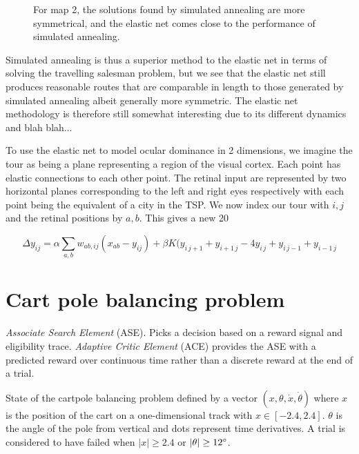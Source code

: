 \documentclass{article}
\begin{document}
\begin{figure}
\begin{subfigure}[t]{0.28\linewidth}
		\label{fig:comp2an}	
	\end{subfigure}%
\caption{For map 2, the solutions found by simulated annealing are more symmetrical, and the elastic net comes close to the performance of simulated annealing.}
\label{fig:comp2}
\end{figure}


Simulated annealing is thus a superior method to the elastic net in terms of solving the travelling salesman problem, but we see that the elastic net still produces reasonable routes that are comparable in length to those generated by simulated annealing albeit generally more symmetric. The elastic net methodology is therefore still somewhat interesting due to its different dynamics and blah blah...

To use the elastic net to model ocular dominance in 2 dimensions, we imagine the tour as being a plane representing a region of the visual cortex. Each point has elastic connections to each other point. The retinal input are represented by two horizontal planes corresponding to the left and right eyes respectively with each point being the equivalent of a city in the TSP. We now index our tour with $i, j$ and the retinal positions by $a, b$. This gives a new 20

\begin{equation}\label{eq:update}
\Delta y_{ij} =\alpha \sum_{a,b}{w_{ab,ij}(x_{ab}-y_{ij})} + \beta K (y_{i \, j+1} + y_{i+1 \, j} - 4y_{i \, j} + y_{i \, j-1} + y_{i-1 \, j}
\end{equation}


\section{Cart pole balancing problem}

\textit{Associate Search Element} (ASE). Picks a decision based on a reward signal and eligibility trace.
\textit{Adaptive Critic Element} (ACE) provides the ASE with a predicted reward over continuous time rather than a discrete reward at the end of a trial.

State of the cartpole balancing problem defined by a vector $(x, \theta, \dot x, \dot \theta)$ where $x$ is the position of the cart on a one-dimensional track with $x \in [-2.4, 2.4]$.
$\theta$ is the angle of the pole from vertical and dots represent time derivatives. A trial is considered to have failed when $|x| \geq 2.4$ or $| \theta | \geq 12 \degree$.
\end{document}

